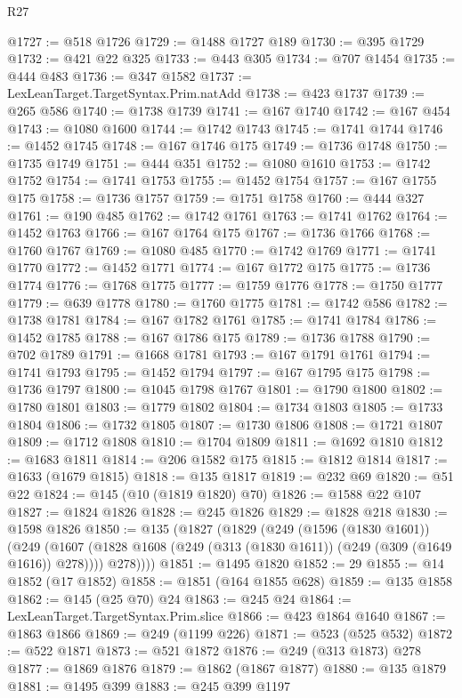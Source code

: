 \begin{lexlean}{R27}
\begin{coremodule}
@1727 := @518 @1726
@1729 := @1488 @1727 @189
@1730 := @395 @1729
@1732 := @421 @22 @325
@1733 := @443 @305
@1734 := @707 @1454
@1735 := @444 @483
@1736 := @347 @1582
@1737 := LexLeanTarget.TargetSyntax.Prim.natAdd
@1738 := @423 @1737
@1739 := @265 @586
@1740 := @1738 @1739
@1741 := @167 @1740
@1742 := @167 @454
@1743 := @1080 @1600
@1744 := @1742 @1743
@1745 := @1741 @1744
@1746 := @1452 @1745
@1748 := @167 @1746 @175
@1749 := @1736 @1748
@1750 := @1735 @1749
@1751 := @444 @351
@1752 := @1080 @1610
@1753 := @1742 @1752
@1754 := @1741 @1753
@1755 := @1452 @1754
@1757 := @167 @1755 @175
@1758 := @1736 @1757
@1759 := @1751 @1758
@1760 := @444 @327
@1761 := @190 @485
@1762 := @1742 @1761
@1763 := @1741 @1762
@1764 := @1452 @1763
@1766 := @167 @1764 @175
@1767 := @1736 @1766
@1768 := @1760 @1767
@1769 := @1080 @485
@1770 := @1742 @1769
@1771 := @1741 @1770
@1772 := @1452 @1771
@1774 := @167 @1772 @175
@1775 := @1736 @1774
@1776 := @1768 @1775
@1777 := @1759 @1776
@1778 := @1750 @1777
@1779 := @639 @1778
@1780 := @1760 @1775
@1781 := @1742 @586
@1782 := @1738 @1781
@1784 := @167 @1782 @1761
@1785 := @1741 @1784
@1786 := @1452 @1785
@1788 := @167 @1786 @175
@1789 := @1736 @1788
@1790 := @702 @1789
@1791 := @1668 @1781
@1793 := @167 @1791 @1761
@1794 := @1741 @1793
@1795 := @1452 @1794
@1797 := @167 @1795 @175
@1798 := @1736 @1797
@1800 := @1045 @1798 @1767
@1801 := @1790 @1800
@1802 := @1780 @1801
@1803 := @1779 @1802
@1804 := @1734 @1803
@1805 := @1733 @1804
@1806 := @1732 @1805
@1807 := @1730 @1806
@1808 := @1721 @1807
@1809 := @1712 @1808
@1810 := @1704 @1809
@1811 := @1692 @1810
@1812 := @1683 @1811
@1814 := @206 @1582 @175
@1815 := @1812 @1814
@1817 := @1633 (@1679 @1815)
@1818 := @135 @1817
@1819 := @232 @69
@1820 := @51 @22
@1824 := @145 (@10 (@1819 @1820) @70)
@1826 := @1588 @22 @107
@1827 := @1824 @1826
@1828 := @245 @1826
@1829 := @1828 @218
@1830 := @1598 @1826
@1850 := @135
    (@1827
      (@1829
        (@249
          (@1596 (@1830 @1601))
          (@249
            (@1607 (@1828 @1608 (@249 (@313 (@1830 @1611)) (@249 (@309 (@1649 @1616)) @278))))
            @278))))
@1851 := @1495 @1820
@1852 := 29
@1855 := @14 @1852 (@17 @1852)
@1858 := @1851 (@164 @1855 @628)
@1859 := @135 @1858
@1862 := @145 (@25 @70) @24
@1863 := @245 @24
@1864 := LexLeanTarget.TargetSyntax.Prim.slice
@1866 := @423 @1864 @1640
@1867 := @1863 @1866
@1869 := @249 (@1199 @226)
@1871 := @523 (@525 @532)
@1872 := @522 @1871
@1873 := @521 @1872
@1876 := @249 (@313 @1873) @278
@1877 := @1869 @1876
@1879 := @1862 (@1867 @1877)
@1880 := @135 @1879
@1881 := @1495 @399
@1883 := @245 @399 @1197

\end{coremodule}
\end{lexlean}
